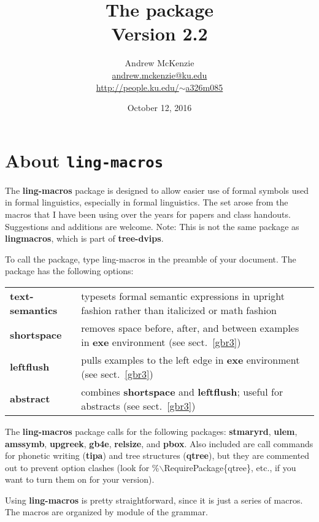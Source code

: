 \documentclass{article}
\title{The \lat{ling-macros} package \\ \Large Version 2.2}
\author{Andrew McKenzie \\ \href{mailto:andrew.mckenzie@ku.edu}{andrew.mckenzie@ku.edu} \\ \href{http://people.ku.edu/~a326m085}{http://people.ku.edu/$\sim$a326m085}
}
\date{October 12, 2016}
\newcommand{\structure}{\color{KUBlue}}				%
\newcommand{\cbl}{{\color{green!60!black}{\{}}}			%
\newcommand{\cbr}{{\color{green!60!black}{\}}}}			%
\newcommand{\comm}[2]{{\rmfamily{\structure{$\backslash$#1}}\cbl#2\cbr}} %
\newcommand{\lat}[1]{{\color{KUBlue}\bfseries\ttfamily #1}}		%
\begin{document}
\newcommand{\commb}[1]{\comm{#1}{\ldots}}

\maketitle

\setcounter{tocdepth}{2}
\tableofcontents

\section{About \texttt{ling-macros}}

The \lat{ling-macros} package is designed to allow easier use of formal symbols used in formal linguistics, especially in formal linguistics. The set arose from the macros that I have been using over the years for papers and class handouts.  Suggestions and additions are welcome.  Note: This is not the same package as \lat{ling{}macros}, which is part of \lat{tree-dvips}.

To call the package, type \comm{usepackage}{ling-macros} in the preamble of your document. The package has the following options:

\begin{tabular}{>{\bfseries\ttfamily}l p{3in}}
text-semantics & typesets formal semantic expressions in upright fashion rather than italicized or math fashion\\
shortspace & removes space before, after, and between examples in \lat{exe} environment (see sect.\ \ref{gbr3}) \\
leftflush  & pulls examples to the left edge in \lat{exe} environment  (see sect.\ \ref{gbr3}) \\
abstract  & combines {\bfseries\ttfamily shortspace} and {\bfseries\ttfamily leftflush}; useful for abstracts (see sect.\ \ref{gbr3})  \\
\end{tabular} 

The \lat{ling-macros} package calls for the following packages: \lat{stmaryrd}, \lat{ulem}, \lat{amssymb}, \lat{upgreek}, \lat{gb4e}, \lat{relsize}, and \lat{pbox}.   Also included are call commands for phonetic writing (\lat{tipa}) and tree structures (\lat{qtree}), but they are commented out to prevent option clashes (look for {\color{red}\%$\backslash${RequirePackage}\{qtree\}}, etc., if you want to turn them on for your version).

Using \lat{ling-macros} is pretty straightforward, since it is just a series of macros. The macros are organized by module of the grammar.
\end{document}
